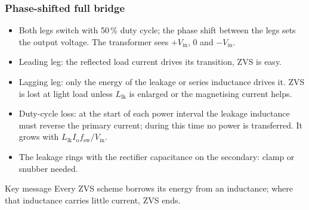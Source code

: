 \begin{frame}
	\frametitle{Phase-shifted full bridge}
	\begin{itemize}
		\item Both legs switch with 50\,\% duty cycle; the phase shift between the legs sets the output voltage. The transformer sees $+V_\mathrm{in}$, 0 and $-V_\mathrm{in}$.
		\item Leading leg: the reflected load current drives its transition, ZVS is easy.
		\item Lagging leg: only the energy of the leakage or series inductance drives it. ZVS is lost at light load unless $L_\mathrm{lk}$ is enlarged or the magnetising current helps.
		\item Duty-cycle loss: at the start of each power interval the leakage inductance must reverse the primary current; during this time no power is transferred. It grows with $L_\mathrm{lk}I_\mathrm{o}f_\mathrm{sw}/V_\mathrm{in}$.
		\item The leakage rings with the rectifier capacitance on the secondary: clamp or snubber needed.
	\end{itemize}
	\begin{block}{Key message}
		Every ZVS scheme borrows its energy from an inductance; where that inductance carries little current, ZVS ends.
	\end{block}
\end{frame}

